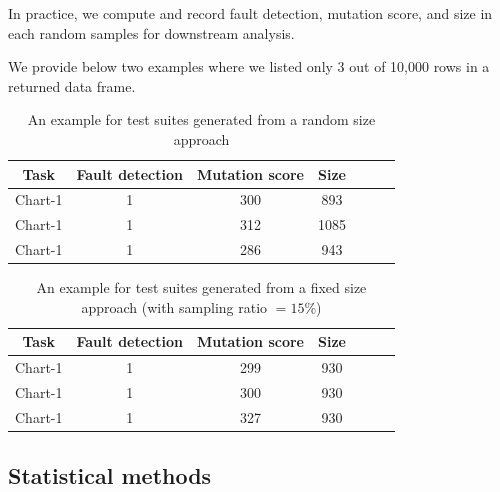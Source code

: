 \documentclass[10pt,letterpaper]{article}
\begin{document}
In practice, we compute and record fault detection, mutation score, and size in each random samples for downstream analysis.

We provide below two examples where we listed only 3 out of 10,000 rows in a returned data frame.

\begin{table}[ht!]
\captionsetup{justification=centering}
\begin{center}
\begin{tabular}{c c c c c c c}
\hline
\multicolumn{1}{c}{Task} & \multicolumn{1}{c}{Fault detection} & \multicolumn{1}{c}{Mutation score} &   \multicolumn{1}{c}{Size}  \\
\hline
Chart-1 &  1  &  300   &   893    \\
Chart-1 &  1  &   312  &   1085        \\
Chart-1 &  1  &   286 &   943      \\
\hline
\end{tabular}
\caption{An example for  test suites generated from a random size approach } \label{tab:random_sample}
\end{center}
\end{table}

\begin{table}[ht!]
\captionsetup{justification=centering}
\begin{center}
\begin{tabular}{c c c c c c c}
\hline
\multicolumn{1}{c}{Task} & \multicolumn{1}{c}{Fault detection} & \multicolumn{1}{c}{Mutation score} &   \multicolumn{1}{c}{Size}  \\
\hline
Chart-1 &  1  &  299   &   930    \\
Chart-1 &  1  &   300  &   930        \\
Chart-1 &  1  &   327 &   930      \\
\hline
\end{tabular}
\caption{An example for  test suites generated from a fixed size approach (with sampling ratio  $= 15\%$)} \label{tab:fixed_sample}
\end{center}
\end{table}



\subsection{Statistical methods}
\end{document}

